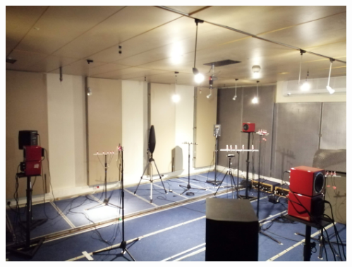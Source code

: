 \begin{frame}[t]{\dechorate  \hfill\faPaintBrush}
{\begin{columns}[T,onlytextwidth]
\begin{column}{0.3\textwidth}
            \end{column}\hfill
            \begin{column}{0.3\textwidth}
                \includegraphics[width=\textwidth]{figures/dechorate/panels}
            \end{column}
        \end{columns}
    }

\end{frame}




